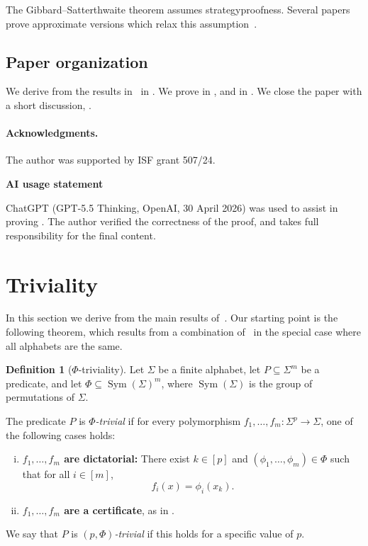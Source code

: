 \documentclass{article}
\DeclareMathOperator{\Sym}{Sym}
\theoremstyle{definition}
\newtheorem{definition}[theorem]{Definition}
\theoremstyle{remark}
\begin{document}
The Gibbard--Satterthwaite theorem assumes strategyproofness. Several papers prove approximate versions which relax this assumption~\cite{FKKN11,IKM12,MR15}.

\subsection*{Paper organization}
We derive  from the results in~\cite{Filmus26} in . We prove  in , and  in . We close the paper with a short discussion, .

\paragraph{Acknowledgments.} The author was supported by ISF grant 507/24.

\begin{aiusagebox}
\begin{center}
\textbf{AI usage statement}
\end{center}

\vspace{0.3em}

ChatGPT (GPT-5.5 Thinking, OpenAI, 30 April 2026) was used to assist in proving .
The author verified the correctness of the proof, and takes full responsibility
for the final content.
\end{aiusagebox}

\section{Triviality}
\label{sec:triviality}

In this section we derive  from the main results of~\cite{Filmus26}. Our starting point is the following theorem, which results from a combination of~\cite[Theorem 1.3 and Theorem 1.4]{Filmus26} in the special case where all alphabets are the same.

\begin{definition}[$\Phi$-triviality]
\label{def:Phi-trivial}
Let $\Sigma$ be a finite alphabet, let $P \subseteq \Sigma^m$ be a predicate, and let $\Phi \subseteq \Sym(\Sigma)^m$, where $\Sym(\Sigma)$ is the group of permutations of $\Sigma$.

The predicate $P$ is \emph{$\Phi$-trivial} if for every polymorphism $f_1,\dots,f_m\colon \Sigma^p \to \Sigma$, one of the following cases holds:
\begin{enumerate}[(i)]
\item \textbf{$f_1,\dots,f_m$ are dictatorial:} There exist $k \in [p]$ and $(\phi_1,\dots,\phi_m) \in \Phi$ such that for all $i \in [m]$,
\[
 f_i(x) = \phi_i(x_k).
\]
\item \textbf{$f_1,\dots,f_m$ are a certificate}, as in .
\end{enumerate}
We say that $P$ is \emph{$(p,\Phi)$-trivial} if this holds for a specific value of $p$.
\end{definition}
\end{document}
